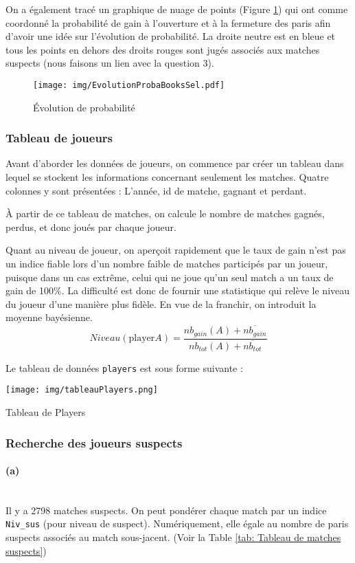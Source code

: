 \documentclass{article}
\begin{document}
\begin{multicols}{2}
	On a également tracé un graphique de nuage de points (Figure \ref{fig: Evolution de probabilite}) qui ont comme coordonné la probabilité de gain à l'ouverture et à la fermeture des paris afin d'avoir une idée sur l'évolution de probabilité. La droite neutre est en bleue et tous les points en dehors des droits rouges sont jugés associés aux matches suspects (nous faisons un lien avec la question 3).
	
	\begin{figure}[H]
		\centering
		\texttt{[image: img/EvolutionProbaBooksSel.pdf]}
		\caption{Évolution de probabilité}
		\label{fig: Evolution de probabilite}
	\end{figure}
	
	\subsubsection{Tableau de joueurs}
	Avant d'aborder les données de joueurs, on commence par créer un tableau dans lequel se stockent les informations concernant seulement les matches. Quatre colonnes y sont présentées : L'année, id de matche, gagnant et perdant. 
	
	À partir de ce tableau de matches, on calcule le nombre de matches gagnés, perdus, et donc joués par chaque joueur. 
	
	Quant au niveau de joueur, on aperçoit rapidement que le taux de gain n'est pas un indice fiable lors d'un nombre faible de matches participés par un joueur, puisque dans un cas extrême, celui qui ne joue qu'un seul match a un taux de gain de 100\%. 
	La difficulté est donc de fournir une statistique qui relève le niveau du joueur d'une manière plus fidèle. En vue de la franchir, on introduit la moyenne bayésienne\cite{bib:Baysian Average}.
	\[ Niveau(\text{player} A)=\frac { nb_{ gain }(A)+\overline { nb_{ gain } }  }{ nb_{ tot }(A)+\overline { nb_{ tot } }  } \]
	
	Le tableau de données \verb|players| est sous forme suivante :
	\begin{table}[H]
		\centering
		\texttt{[image: img/tableauPlayers.png]}
		\label{tab: tableau de players}
		\caption{Tableau de Players}
	\end{table}
	
	\subsubsection{Recherche des joueurs suspects}
	\paragraph{(a)}
    ~\\
    Il y a 2798 matches suspects. On peut pondérer chaque match par un indice \verb|Niv_sus| (pour niveau de suspect). Numériquement, elle égale au nombre de paris suspects associés au match sous-jacent. (Voir la Table \ref{tab: Tableau de matches suspects})

\end{multicols}
\end{document}
